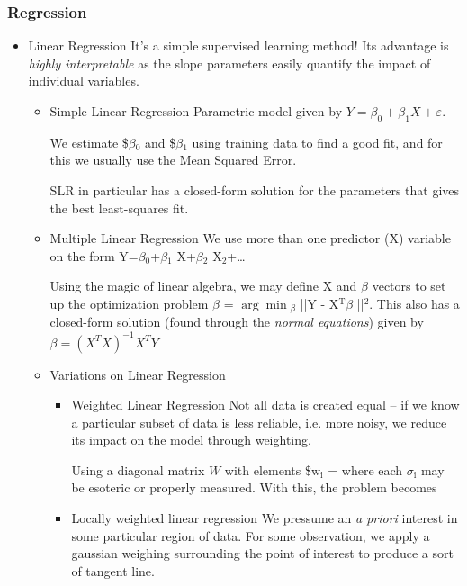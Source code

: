 \documentclass[11pt]{article}
\begin{document}
\begin{itemize}
\subsubsection*{Regression}
\label{sec-3-2-2}
\begin{itemize}
\item Linear Regression
\label{sec-3-2-2-1}
It's a simple supervised learning method! Its advantage is \emph{highly interpretable} as the slope parameters easily quantify the impact of individual variables.
\begin{itemize}
\item Simple Linear Regression
\label{sec-3-2-2-1-1}
Parametric model given by $Y=\beta_0 + \beta_1 X + \varepsilon$.

We estimate \$\hat$\beta$$_{\text{0}}$ and \$\hat$\beta$$_{\text{1}}$ using training data to find a good fit, and for this we usually use the Mean Squared Error.

SLR in particular has a closed-form solution for the parameters that gives the best least-squares fit.
\item Multiple Linear Regression
\label{sec-3-2-2-1-2}
We use more than one predictor (X) variable on the form Y=$\beta$$_{\text{0}}$+$\beta$$_{\text{1}}$ X+$\beta$$_{\text{2}}$ X$_{\text{2}}$+\ldots{}

Using the magic of linear algebra, we may define X and $\beta$ vectors to set up the optimization problem \hat$\beta$ = $\arg$$\min$$_{\beta}$ ||Y - X$^{\text{T}}$$\beta$ ||$^{\text{2}}$. This also has a closed-form solution (found through the \emph{normal equations}) given by $\beta = \left(X^TX\right)^{-1}X^TY$

\item Variations on Linear Regression
\label{sec-3-2-2-1-3}
\begin{itemize}
\item Weighted Linear Regression
\label{sec-3-2-2-1-3-1}
Not all data is created equal -- if we know a particular subset of data is less reliable, i.e. more noisy, we reduce its impact on the model through weighting.

Using a diagonal matrix $W$ with elements \$w$_{\text{i}}$ =  where each $\sigma$$_{\text{i}}$ may be esoteric or properly measured. With this, the problem becomes
\item Locally weighted linear regression
\label{sec-3-2-2-1-3-2}
We pressume an \emph{a priori} interest in some particular region of data. For some observation, we apply a gaussian weighing surrounding the point of interest to produce a sort of tangent line.


\end{itemize}
\end{itemize}
\end{itemize}
\end{itemize}
\end{document}
